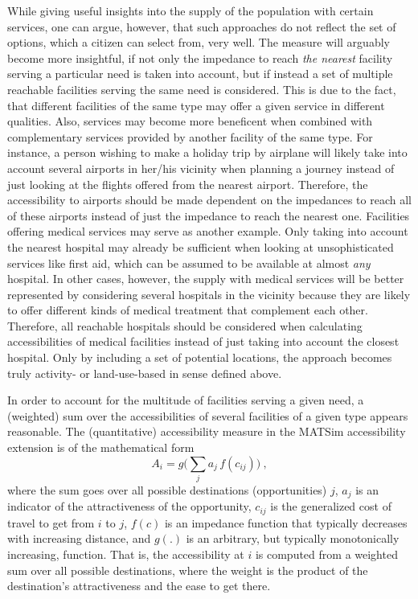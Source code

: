 While giving useful insights into the supply of the population with certain services, one can argue, however, that such approaches do not reflect the set of options, which a citizen can select from, very well. The measure will
arguably become more insightful, if not only the impedance to reach \textit{the nearest} facility serving a particular need is taken into account, but if instead a set of multiple reachable facilities serving the same need is considered. This is due to the fact, that different facilities of the same type may offer a given service in different qualities. Also, services may become more beneficent when combined with complementary services provided by another facility of the same type. For instance, a person wishing to make a holiday trip by airplane will likely take into account several airports in her/his vicinity when planning a journey instead of just looking at the flights offered from the nearest airport. Therefore, the accessibility to airports should be made dependent on the impedances to reach all of these airports instead of just the impedance to reach the nearest one. Facilities offering medical services may serve as another example. Only taking into account the nearest hospital may already be sufficient when looking at unsophisticated services like first aid, which can be assumed to be available at almost \textit{any} hospital. In other cases, however, the supply with medical services will be better represented by considering several hospitals in the vicinity because they are likely to offer different kinds of medical treatment that complement each other. Therefore, all reachable hospitals should be considered when calculating accessibilities of medical facilities instead of just taking into account the closest hospital. Only by including a set of potential locations, the approach becomes truly activity- or land-use-based in sense defined above.

In order to account for the multitude of facilities serving a given need, a (weighted) sum over the accessibilities of several facilities of a given type appears reasonable. The (quantitative) accessibility measure in the MATSim accessibility extension is of the mathematical form
\begin{equation}
A_i = g\Big( \sum_j a_j \, f(c_{ij}) \Big) \ ,
\label{eq:accessibility:basic}
\end{equation}
where the sum goes over all possible destinations (opportunities) $j$, $a_j$ is an indicator of the attractiveness of the opportunity, $c_{ij}$ is the generalized cost of travel to get from $i$ to $j$, $f(c)$ is an impedance function that typically decreases with increasing distance, and $g(.)$ is an arbitrary, but typically monotonically increasing, function.  That is, the accessibility at $i$ is computed from a weighted sum over all possible destinations, where the weight is the product of the destination's attractiveness and the ease to get there.

